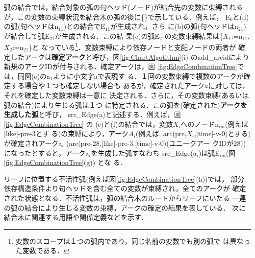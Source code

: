 弧の結合では，結合対象の弧の句ヘッド(ノード)が結合先の変数に束縛される
が，この変数の束縛状況を結合木の弧の後に\{\}で示している．例えば，
E$_0$と(d)の弧(句ヘッドはn$_{11}$)との結合でE$_{11}$が生成され，さら
に(b)の弧(句ヘッドはn$_{21}$)が結合して弧E$_{21}$が生成される．この結
果(c)の弧E$_{21}$の変数束縛結果は\{$X_1$:=n$_{11}$,$X_2$:=n$_{21}$\}と
なっている\footnote{変数のスコープは１つの弧内であり，同じ名前の変数でも別の弧で
は異なった変数である．}．変数束縛により依存ノードと支配ノードの両者が
確定したアークは{\bf 確定アーク}と呼び，図\ref{fig:ChartAlgotithm}(i) 
のadd\_arcidにより新規のアークIDが付与される．確定アークは，図
\ref{fig:EdgeCombinationTree}では，同図(e)のa$_1$ように小文字aで表現す
る．１回の変数束縛で複数のアークが確定する場合や１つも確定しない場合も
あるが，確定されたアーク$a$に対しては，それを確定した変数束縛は一意に
決定される．さらに，その変数束縛(あるいは弧の結合)により生じる弧は１つ
に特定される．この弧を(確定された){\bf アークを生成した弧}と呼び，
src\_Edge(a)と記述する．例えば，図\ref{fig:EdgeCombinationTree} の
(e)と(f)の結合では，変数$X_i$へのノードn$_{im}$(例えば[like]-pre-3とす
る)の束縛により，アーク$A_i$(例えば, arc(pre,$X_i$,[time]-v-0)とする) 
が確定されアークa$_i$ (arc(pre-28,[like]-pre-3,[time]-v-0)(ユニークアー
クIDが28))になったとすると，アークa$_i$を生成した弧すなわち
src\_Edge(a$_i$)は弧E$_{im}$(図\ref{fig:EdgeCombinationTree}(g)) とな
る．

リーフに位置する不活性弧(例えば図\ref{fig:EdgeCombinationTree}(h))では，
部分依存構造条件より句ヘッドを含む全ての変数が束縛され，全てのアークが
確定された状態となる．不活性弧は，弧の結合木のルートからリーフにいたる
一連の弧の結合により生じる変数の束縛，アークの確定の結果を表している．
次に結合木に関連する用語や関係定義などを示す．


